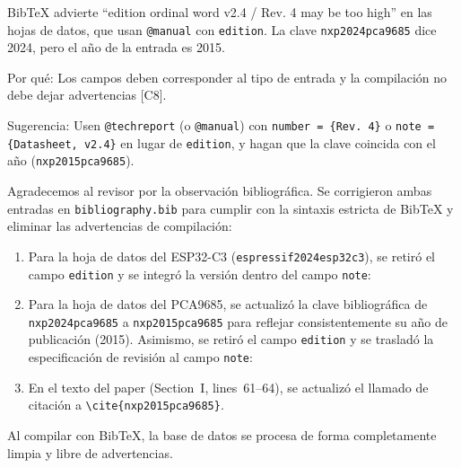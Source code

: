 \documentclass{LabDSTresponse}
\begin{document}
{Bib\TeX{} advierte “edition ordinal word v2.4 / Rev. 4 may be too high” en las hojas de datos, que usan \texttt{@manual} con \texttt{edition}. La clave \texttt{nxp2024pca9685} dice 2024, pero el año de la entrada es 2015.

Por qué: Los campos deben corresponder al tipo de entrada y la compilación no debe dejar advertencias [C8].

Sugerencia: Usen \texttt{@techreport} (o \texttt{@manual}) con \texttt{number = \{Rev. 4\}} o \texttt{note = \{Datasheet, v2.4\}} en lugar de \texttt{edition}, y hagan que la clave coincida con el año (\texttt{nxp2015pca9685}).}
{Agradecemos al revisor por la observación bibliográfica. Se corrigieron ambas entradas en \texttt{bibliography.bib} para cumplir con la sintaxis estricta de Bib\TeX{} y eliminar las advertencias de compilación:
\begin{enumerate}
    \item Para la hoja de datos del ESP32-C3 (\texttt{espressif2024esp32c3}), se retiró el campo \texttt{edition} y se integró la versión dentro del campo \texttt{note}:
    \item Para la hoja de datos del PCA9685, se actualizó la clave bibliográfica de \texttt{nxp2024pca9685} a \texttt{nxp2015pca9685} para reflejar consistentemente su año de publicación (2015). Asimismo, se retiró el campo \texttt{edition} y se trasladó la especificación de revisión al campo \texttt{note}:
    \item En el texto del paper (Section~I, lines~61--64), se actualizó el llamado de citación a \texttt{\textbackslash cite\{nxp2015pca9685\}}.
\end{enumerate}
Al compilar con Bib\TeX{}, la base de datos se procesa de forma completamente limpia y libre de advertencias.}
\end{document}
